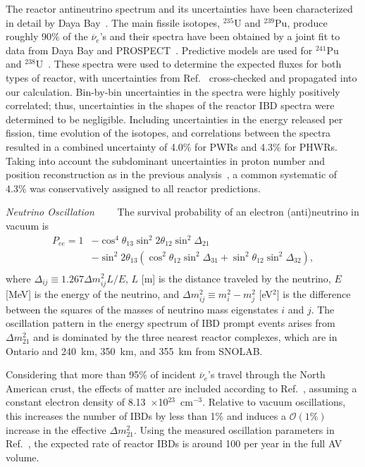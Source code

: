 \documentclass[%
 reprint,
superscriptaddress,
 amsmath,amssymb,
 aps,
]{revtex4-2}
\newcommand{\nuebars}{$\overline{\nu}_{e}$'s }
\begin{document}
The reactor antineutrino spectrum and its uncertainties have been characterized in detail by Daya Bay~\cite{DayaBay2019}. The main fissile isotopes, $^{235}$U and $^{239}$Pu, produce roughly 90\% of the \nuebars and their spectra have been obtained by a joint fit to data from Daya Bay and PROSPECT~\cite{daya_bay_prospect_spectrum}. Predictive models are used for $^{241}$Pu~\cite{huber2011determination} and $^{238}$U~\cite{mueller2011improved}. 
These spectra were used to determine the expected fluxes for both types of reactor, with uncertainties from Ref.~\cite{DayaBay2019} cross-checked and propagated into our calculation. 
Bin-by-bin uncertainties in the spectra were highly positively correlated; thus, uncertainties in the shapes of the reactor IBD spectra were determined to be negligible. 
Including uncertainties in the energy released per fission, time evolution of the isotopes, and correlations between the spectra resulted in a combined uncertainty of 4.0\% for PWRs and 4.3\% for PHWRs. 
Taking into account the subdominant uncertainties in proton number and position reconstruction as in the previous analysis~\cite{sno+ppo}, a common systematic of 4.3\% was conservatively assigned to all reactor predictions. 


\smallskip
\textit{Neutrino Oscillation}~~\textemdash~~
The survival probability of an electron (anti)neutrino in vacuum is 
\begin{equation*}
\begin{aligned}
P_{ee} = 1
& \left. -\cos^{4}\theta_{13}\sin^{2} 2\theta_{12}\sin^{2}\Delta_{21}\right.\\
& \left. -\sin^{2}2\theta_{13}(\cos^{2}\theta_{12}\sin^{2}\Delta_{31} + \sin^{2}\theta_{12}\sin^{2}\Delta_{32}), \right.\\
\end{aligned}
\end{equation*}
where $\Delta_{ij} \equiv 1.267\Delta m_{ij}^{2}L/E$, $L$ [m] is the distance traveled by the neutrino, $E$ [MeV] is the energy of the neutrino, and $\Delta m_{ij}^{2} \equiv m_i^2-m_j^2$ [eV$^2]$ is the difference between the squares of the masses of neutrino mass eigenstates $i$ and $j$.  
The oscillation pattern in the energy spectrum of IBD prompt events arises from $\Delta m^2_{21}$ and is dominated by the three nearest reactor complexes, which are in Ontario and 240~km, 350~km, and 355~km from SNOLAB. 

Considering that more than 95\% of incident \nuebars travel through the North American crust, the effects of matter are included according to Ref.~\cite{mattOsc}, assuming a constant electron density of 8.13~$\times$10$^{23}$~cm$^{-3}$. 
Relative to vacuum oscillations, this increases the number of IBDs by less than 1\% and induces a $\mathcal{O}(1\%)$ increase in the effective $\Delta m_{21}^2$. 
Using the measured oscillation parameters in Ref.~\cite{PDG2025}, the expected rate of reactor IBDs is around 100 per year in the full AV volume. 
\end{document}
